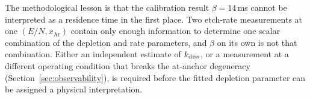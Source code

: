 The methodological lesson is that the calibration result
$\beta = 14\,$ms cannot be interpreted as a residence time in the
first place. Two etch-rate measurements at one
$(E/N,x_{\mathrm{Ar}})$ contain only enough information to
determine one scalar combination of the depletion and rate
parameters, and $\beta$ on its own is not that combination. Either
an independent estimate of $k_{\mathrm{diss}}$, or a measurement at a
different operating condition that breaks the at-anchor degeneracy
(Section~\ref{sec:observability}), is required before the fitted
depletion parameter can be assigned a physical interpretation.

